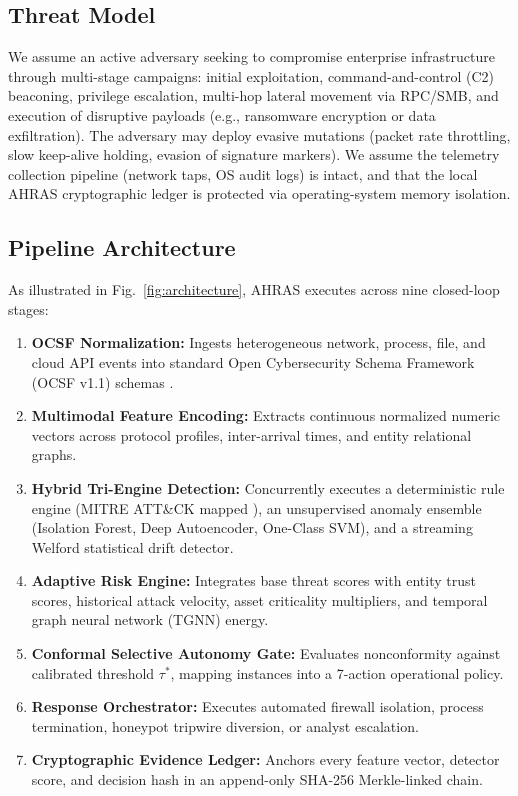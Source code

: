 \documentclass[10pt,journal,compsoc]{IEEEtran}
\begin{document}
\subsection{Threat Model}
We assume an active adversary seeking to compromise enterprise infrastructure through multi-stage campaigns: initial exploitation, command-and-control (C2) beaconing, privilege escalation, multi-hop lateral movement via RPC/SMB, and execution of disruptive payloads (e.g., ransomware encryption or data exfiltration). The adversary may deploy evasive mutations (packet rate throttling, slow keep-alive holding, evasion of signature markers). We assume the telemetry collection pipeline (network taps, OS audit logs) is intact, and that the local AHRAS cryptographic ledger is protected via operating-system memory isolation.

\subsection{Pipeline Architecture}
As illustrated in Fig.~\ref{fig:architecture}, AHRAS executes across nine closed-loop stages:
\begin{enumerate}
    \item \textbf{OCSF Normalization:} Ingests heterogeneous network, process, file, and cloud API events into standard Open Cybersecurity Schema Framework (OCSF v1.1) schemas \cite{ocsf2023schema}.
    \item \textbf{Multimodal Feature Encoding:} Extracts continuous normalized numeric vectors across protocol profiles, inter-arrival times, and entity relational graphs.
    \item \textbf{Hybrid Tri-Engine Detection:} Concurrently executes a deterministic rule engine (MITRE ATT\&CK mapped \cite{strom2018mitre}), an unsupervised anomaly ensemble (Isolation Forest, Deep Autoencoder, One-Class SVM), and a streaming Welford statistical drift detector.
    \item \textbf{Adaptive Risk Engine:} Integrates base threat scores with entity trust scores, historical attack velocity, asset criticality multipliers, and temporal graph neural network (TGNN) energy.
    \item \textbf{Conformal Selective Autonomy Gate:} Evaluates nonconformity against calibrated threshold $\tau^*$, mapping instances into a 7-action operational policy.
    \item \textbf{Response Orchestrator:} Executes automated firewall isolation, process termination, honeypot tripwire diversion, or analyst escalation.
    \item \textbf{Cryptographic Evidence Ledger:} Anchors every feature vector, detector score, and decision hash in an append-only SHA-256 Merkle-linked chain.
\end{enumerate}
\end{document}
